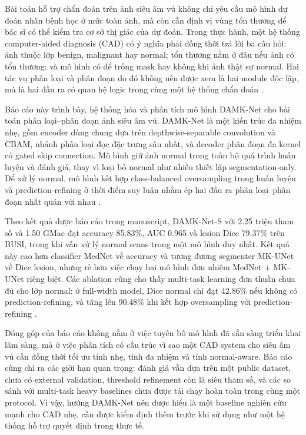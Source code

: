 \documentclass[12pt,a4paper,oneside]{report}
\newcommand{\modelname}{DAMK-Net}
\newcommand{\modelnames}{DAMK-Net-S}
\begin{document}
Bài toán hỗ trợ chẩn đoán trên ảnh siêu âm vú không chỉ yêu cầu mô hình dự đoán nhãn bệnh học ở mức toàn ảnh, mà còn cần định vị vùng tổn thương để bác sĩ có thể kiểm tra cơ sở thị giác của dự đoán. Trong thực hành, một hệ thống computer-aided diagnosis (CAD) có ý nghĩa phải đồng thời trả lời ba câu hỏi: ảnh thuộc lớp benign, malignant hay normal; tổn thương nằm ở đâu nếu ảnh có tổn thương; và mô hình có để trống mask hay không khi ảnh thật sự normal. Hai tác vụ phân loại và phân đoạn do đó không nên được xem là hai module độc lập, mà là hai đầu ra có quan hệ logic trong cùng một hệ thống chẩn đoán \citep{busi,aumente,damknet}.

Báo cáo này trình bày, hệ thống hóa và phân tích mô hình \modelname{} cho bài toán phân loại--phân đoạn ảnh siêu âm vú. \modelname{} là một kiến trúc đa nhiệm nhẹ, gồm encoder dùng chung dựa trên depthwise-separable convolution và CBAM, nhánh phân loại đọc đặc trưng sâu nhất, và decoder phân đoạn đa kernel có gated skip connection. Mô hình giữ ảnh normal trong toàn bộ quá trình huấn luyện và đánh giá, thay vì loại bỏ normal như nhiều thiết lập segmentation-only. Để xử lý normal, mô hình kết hợp class-balanced oversampling trong huấn luyện và prediction-refining ở thời điểm suy luận nhằm ép hai đầu ra phân loại--phân đoạn nhất quán với nhau \citep{mednet,cbam,mkunet,aumente,damknet}.

Theo kết quả được báo cáo trong manuscript, \modelnames{} với 2.25 triệu tham số và 1.50 GMac đạt accuracy 85.83\%, AUC 0.965 và lesion Dice 79.37\% trên BUSI, trong khi vẫn xử lý normal scans trong một mô hình duy nhất. Kết quả này cao hơn classifier MedNet về accuracy và tương đương segmenter MK-UNet về Dice lesion, nhưng rẻ hơn việc chạy hai mô hình đơn nhiệm MedNet + MK-UNet riêng biệt. Các ablation cũng cho thấy multi-task learning đơn thuần chưa đủ cho lớp normal: ở full-width model, Dice normal chỉ đạt 42.86\% nếu không có prediction-refining, và tăng lên 90.48\% khi kết hợp oversampling với prediction-refining \citep{damknet}.

Đóng góp của báo cáo không nằm ở việc tuyên bố mô hình đã sẵn sàng triển khai lâm sàng, mà ở việc phân tích có cấu trúc vì sao một CAD system cho siêu âm vú cần đồng thời tối ưu tính nhẹ, tính đa nhiệm và tính normal-aware. Báo cáo cũng chỉ ra các giới hạn quan trọng: đánh giá vẫn dựa trên một public dataset, chưa có external validation, threshold refinement còn là siêu tham số, và các so sánh với multi-task heavy baselines chưa được tái chạy hoàn toàn trong cùng một protocol. Vì vậy, hướng \modelname{} nên được hiểu là một baseline nghiên cứu mạnh cho CAD nhẹ, cần được kiểm định thêm trước khi sử dụng như một hệ thống hỗ trợ quyết định trong thực tế.
\end{document}
